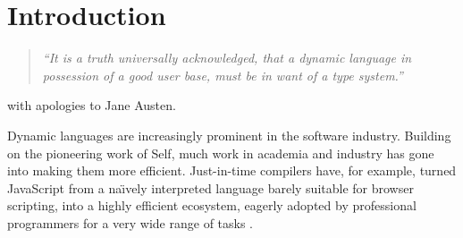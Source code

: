 
\section{Introduction}
\label{sec:introduction}

\begin{verse}
  \textit{``It is a truth universally acknowledged, that a dynamic language
    in possession of a good user base, must be in want of a type system.''}
\end{verse}
\begin{flushright}
with apologies to Jane Austen.
\end{flushright}
  


%
%

Dynamic languages are increasingly prominent in the software industry.
Building on the pioneering work of Self\citep{Self}, 
much work in academia and industry
has gone into making them more efficient\citep{Bolz2013,Bolz:2013:IMT,Wurthinger:2017:PPE,Daloze2016,Clifford:2015:MM,Degenbaev:2016:ITG}.
Just-in-time compilers have, for example, turned JavaScript from a
na{\"\i}vely interpreted language barely suitable for browser scripting, 
into a highly efficient ecosystem, eagerly adopted
by professional programmers for a very wide range of tasks \cite{Pang2018}.

